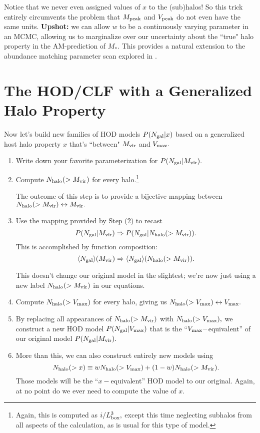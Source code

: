 \documentclass[usenatbib,usegraphicx,letterpaper]{mn2e}
\newcommand{\Ngal}{N_{\rm gal}}
\newcommand{\Nhalo}{N_{\rm halo}}
\newcommand{\vmax}{V_{\rm max}}
\newcommand{\mvir}{M_{\rm vir}}
\newcommand{\mpeak}{M_{\rm peak}}
\newcommand{\vpeak}{V_{\rm peak}}
\newcommand{\ben}{\begin{enumerate}}
\newcommand{\een}{\end{enumerate}}
\newcommand{\mstar}{M_{\ast}}
\begin{document}
Notice that we never even assigned values of $x$ to the (sub)halos! So this trick entirely circumvents the problem that $\mpeak$ and $\vpeak$ do not even have the same units. {\bf Upshot:} we can allow $w$ to be a continuously varying parameter in an MCMC, allowing us to  marginalize over our uncertainty about the ``true" halo property in the AM-prediction of $\mstar.$ This provides a natural extension to the abundance matching parameter scan explored in \citet{reddick_etal12}. 


\section{The HOD/CLF with a Generalized Halo Property}
\label{sec:hodclf}

Now let's build new families of HOD models $P(\Ngal|x)$ based on a generalized host halo property $x$ that's ``between" $\mvir$ and $\vmax.$ 

\ben
\item Write down your favorite parameterization for $P(\Ngal | \mvir).$
\item Compute $\Nhalo(>\mvir)$ for every halo.\footnote{Again, this is computed as $i/L_{\rm box}^{3},$ except this time neglecting subhalos from all aspects of the calculation, as is usual for this type of model.} 

The outcome of this step is to provide a bijective mapping between $\Nhalo(>\mvir)\leftrightarrow\mvir.$ 
\item Use the mapping provided by Step (2) to recast $$P(\Ngal | \mvir)\Rightarrow P(\Ngal |\Nhalo(>\mvir)).$$
This is accomplished by function composition: $$\langle\Ngal\rangle(\mvir)\Rightarrow\langle\Ngal\rangle(\Nhalo(>\mvir)).$$

This doesn't change our original model in the slightest; we're now just using a new label $\Nhalo(>\mvir)$ in our equations.
\item Compute $\Nhalo(>\vmax)$ for every halo, giving us $\Nhalo(>\vmax)\leftrightarrow\vmax.$ 
\item By replacing all appearances of $\Nhalo(>\mvir)$ with $\Nhalo(>\vmax),$ 
we construct a new HOD model $P(\Ngal|\vmax)$ that is the ``$\vmax-$equivalent'' of our original model $P(\Ngal | \mvir).$
\item More than this, we can also construct entirely new models using $$\Nhalo(>x) \equiv w\Nhalo(>\vmax) + (1-w)\Nhalo(>\mvir).$$ 
Those models will be the ``$x-$equivalent'' HOD model to our original. Again, at no point do we ever need to compute the value of $x.$
\een
\end{document}
